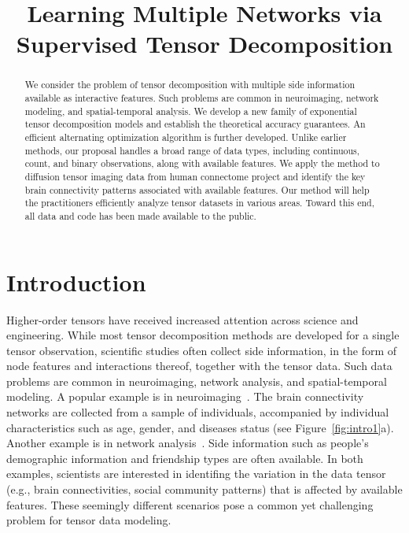 \documentclass{article}
\title{Learning Multiple Networks via Supervised Tensor Decomposition}
\theoremstyle{definition}
\theoremstyle{definition}
\begin{document}
\maketitle

\begin{abstract}
We consider the problem of tensor decomposition with multiple side information available as interactive features. Such problems are common in neuroimaging, network modeling, and spatial-temporal analysis. We develop a new family of exponential tensor decomposition models and establish the theoretical accuracy guarantees. An efficient alternating optimization algorithm is further developed. Unlike earlier methods, our proposal handles a broad range of data types, including continuous, count, and binary observations, along with available features. We apply the method to diffusion tensor imaging data from human connectome project and identify the key brain connectivity patterns associated with available features. Our method will help the practitioners efficiently analyze tensor datasets in various areas. Toward this end, all data and code has been made available to the public. 
\end{abstract}

\section{Introduction}
 Higher-order tensors have received increased attention across science and engineering. While most tensor decomposition methods are developed for a single tensor observation, scientific studies often collect side information, in the form of node features and interactions thereof, together with the tensor data. Such data problems are common in neuroimaging, network analysis, and spatial-temporal modeling. A popular example is in neuroimaging~\citep{zhou2013tensor}. The brain connectivity networks are collected from a sample of individuals, accompanied by individual characteristics such as age, gender, and diseases status (see Figure~\ref{fig:intro1}a). Another example is in network analysis~\citep{pmlr-v108-berthet20a}. Side information such as people’s demographic information and friendship types are often available. In both examples, scientists are interested in identifing the variation in the data tensor (e.g., brain connectivities, social community patterns) that is affected by available features. These seemingly different scenarios pose a common yet challenging problem for tensor data modeling. 
 
\end{document}
